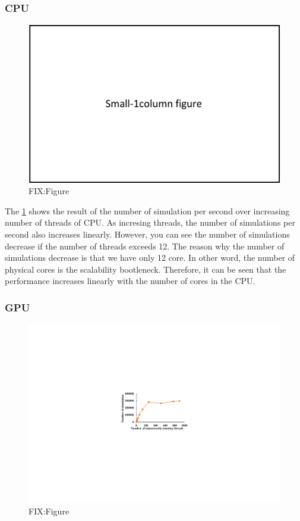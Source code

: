 \documentclass[conference]{IEEEtran}
\begin{document}
\subsubsection{CPU}
\begin{figure}
\includegraphics{figures/fit_1col.pdf}
\caption{FIX:Figure}
\label{fig:cpu_num_simulation}
\end{figure}

The \cref{fig:cpu_num_simulation} shows the result of the number of simulation per second over increasing number of threads of CPU. As incresing threads, the number of simulations per second also increases linearly. 
However, you can see the number of simulations decrease if the number of threads exceeds 12. 
The reason why the number of simulations decrease is that we have only 12 core. In other word, the number of physical cores is the scalability bootleneck. 
Therefore, it can be seen that the performance increases linearly with the number of cores in the CPU. 
\subsubsection{GPU}
\begin{figure}
\includegraphics{figures/gpu_num_simulation.pdf}
\caption{FIX:Figure}
\label{fig:gpu_num_simulation}
\end{figure}
\end{document}
